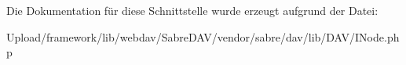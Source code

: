 Die Dokumentation für diese Schnittstelle wurde erzeugt aufgrund der Datei\+:\begin{DoxyCompactItemize}
\item 
Upload/framework/lib/webdav/\+Sabre\+D\+A\+V/vendor/sabre/dav/lib/\+D\+A\+V/I\+Node.\+php\end{DoxyCompactItemize}
